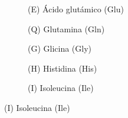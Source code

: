 \begin{figure}
\centering
    
    \begin{subfigure}{0.9\textwidth}
        \centering
        \caption{(E) Ácido glutámico (Glu)}
        \label{fig:ácido_glutámico}
    \end{subfigure}
    
    \vspace{0.75cm}
    
    \begin{subfigure}{0.9\textwidth}
        \centering
        \caption{(Q) Glutamina (Gln)}
        \label{fig:glutamina}
    \end{subfigure}
    
    \vspace{0.75cm}
    
    \begin{subfigure}{0.9\textwidth}
        \centering
        \caption{(G) Glicina (Gly)}
        \label{fig:glicina}
    \end{subfigure}
    
    \vspace{0.75cm}
    
    \begin{subfigure}{0.9\textwidth}
        \centering
        \caption{(H) Histidina (His)}
        \label{fig:histidina}
    \end{subfigure}
    
    \vspace{0.75cm}
    
    \begin{subfigure}{0.9\textwidth}
        \centering
        \caption{(I) Isoleucina (Ile)}
        \label{fig:isoleucina}
    \end{subfigure}
    
\end{figure}

